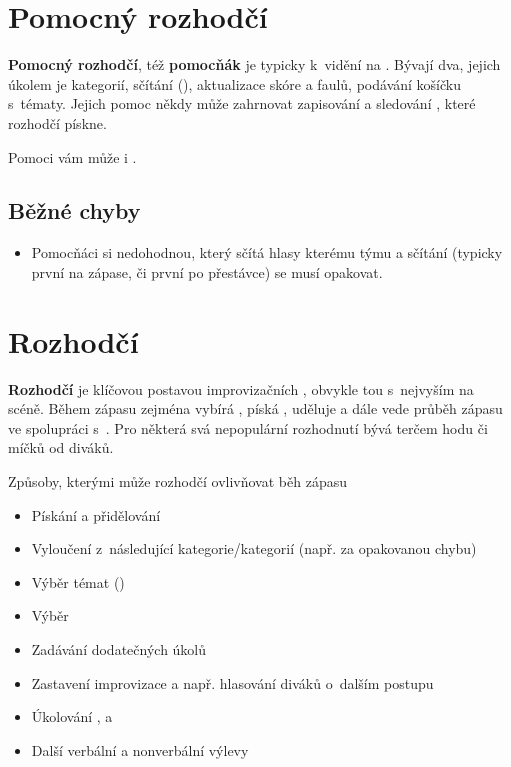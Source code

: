  
 
\needspace{5cm} \section{Pomocný rozhodčí} \label{pomocný rozhodčí} \textbf{Pomocný rozhodčí}, též \textbf{pomocňák} je typicky k~vidění na . 
Bývají dva, jejich úkolem je  kategorií, sčítání  (), aktualizace skóre a faulů, podávání košíčku s~tématy. Jejich pomoc  někdy může zahrnovat zapisování a sledování , které rozhodčí pískne.  
 
Pomoci vám může i . 
\subsection{Běžné chyby} \begin{itemize}
\item Pomocňáci si nedohodnou, který sčítá hlasy kterému týmu a sčítání (typicky první na zápase, či první po přestávce) se musí opakovat.
\end{itemize}
 
 
 
\needspace{5cm} \section{Rozhodčí} \label{rozhodčí} \textbf{Rozhodčí} je klíčovou postavou improvizačních , obvykle tou s~nejvyším  na scéně. 
Během zápasu zejména vybírá , píská , uděluje   a  
dále vede průběh zápasu ve spolupráci s~. 
Pro některá svá nepopulární rozhodnutí bývá terčem hodu  či míčků od diváků. 
 
 
Způsoby, kterými může rozhodčí ovlivňovat běh zápasu 
\begin{itemize}
\item Pískání  a přidělování 
\item Vyloučení z~následující kategorie/kategorií (např. za opakovanou chybu)
\item Výběr témat ()
\item Výběr 
\item Zadávání dodatečných úkolů 
\item Zastavení improvizace a např. hlasování diváků o~dalším postupu
\item Úkolování ,  a 
\item Další verbální a nonverbální výlevy
\end{itemize}
 
